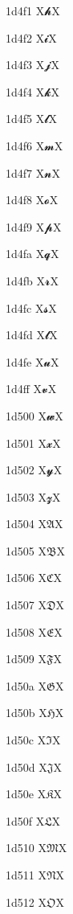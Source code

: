 \documentclass[11pt]{article}
\begin{document}
1d4f1 X{\ensuremath{\mathbfscr{h}}}X

1d4f2 X{\ensuremath{\mathbfscr{i}}}X

1d4f3 X{\ensuremath{\mathbfscr{j}}}X

1d4f4 X{\ensuremath{\mathbfscr{k}}}X

1d4f5 X{\ensuremath{\mathbfscr{l}}}X

1d4f6 X{\ensuremath{\mathbfscr{m}}}X

1d4f7 X{\ensuremath{\mathbfscr{n}}}X

1d4f8 X{\ensuremath{\mathbfscr{o}}}X

1d4f9 X{\ensuremath{\mathbfscr{p}}}X

1d4fa X{\ensuremath{\mathbfscr{q}}}X

1d4fb X{\ensuremath{\mathbfscr{r}}}X

1d4fc X{\ensuremath{\mathbfscr{s}}}X

1d4fd X{\ensuremath{\mathbfscr{t}}}X

1d4fe X{\ensuremath{\mathbfscr{u}}}X

1d4ff X{\ensuremath{\mathbfscr{v}}}X

1d500 X{\ensuremath{\mathbfscr{w}}}X

1d501 X{\ensuremath{\mathbfscr{x}}}X

1d502 X{\ensuremath{\mathbfscr{y}}}X

1d503 X{\ensuremath{\mathbfscr{z}}}X

1d504 X{\ensuremath{\mathfrak{A}}}X

1d505 X{\ensuremath{\mathfrak{B}}}X

1d506 X{\ensuremath{\mathfrak{C}}}X

1d507 X{\ensuremath{\mathfrak{D}}}X

1d508 X{\ensuremath{\mathfrak{E}}}X

1d509 X{\ensuremath{\mathfrak{F}}}X

1d50a X{\ensuremath{\mathfrak{G}}}X

1d50b X{\ensuremath{\mathfrak{H}}}X

1d50c X{\ensuremath{\mathfrak{I}}}X

1d50d X{\ensuremath{\mathfrak{J}}}X

1d50e X{\ensuremath{\mathfrak{K}}}X

1d50f X{\ensuremath{\mathfrak{L}}}X

1d510 X{\ensuremath{\mathfrak{M}}}X

1d511 X{\ensuremath{\mathfrak{N}}}X

1d512 X{\ensuremath{\mathfrak{O}}}X
\end{document}
